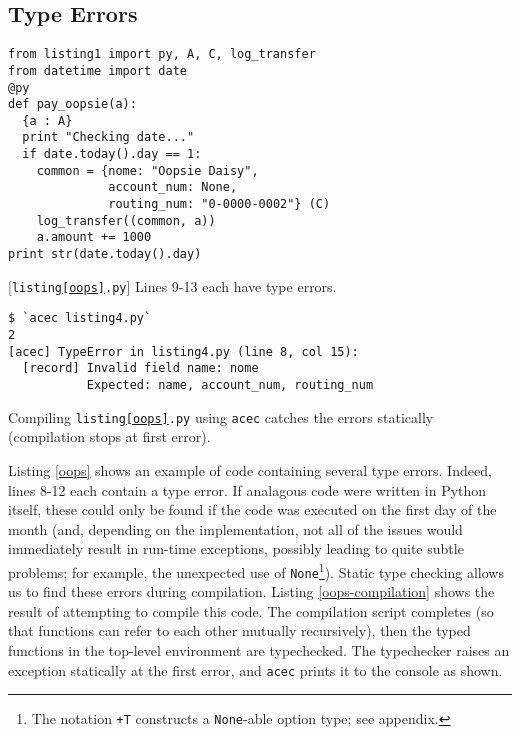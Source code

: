 \documentclass[10pt,preprint]{sigplanconf}
\begin{document}
{%

\subsection{Type Errors}
\begin{codelisting}[t]
\begin{lstlisting}
from listing1 import py, A, C, log_transfer
from datetime import date
@py
def pay_oopsie(a):
  {a : A}
  print "Checking date..."
  if date.today().day == 1:
    common = {nome: "Oopsie Daisy",
              account_num: None,
              routing_num: "0-0000-0002"} (C)
    log_transfer((common, a))
    a.amount += 1000 
print str(date.today().day)
\end{lstlisting}
\caption{[\texttt{listing\ref{oops}.py}] Lines 9-13 each have type errors.}
\label{oops}
\end{codelisting}
\begin{codelisting}
\begin{lstlisting}[style=Bash]
$ `acec listing4.py`
2
[acec] TypeError in listing4.py (line 8, col 15): 
  [record] Invalid field name: nome
           Expected: name, account_num, routing_num
\end{lstlisting}
\caption{Compiling \texttt{listing\ref{oops}.py} using \texttt{acec} catches the errors statically (compilation stops at first error).}
\label{oops-compilation}
\end{codelisting}Listing \ref{oops} shows an example of code containing several type errors. Indeed, lines 8-12 each contain a type error. If analagous code were written in Python itself, these could only be found if the code was executed on the first day of the month (and, depending on the implementation, not all of the issues would  immediately result in run-time exceptions, possibly leading to quite subtle problems; for example, the unexpected use of \verb|None|\footnote{The notation \texttt{+T} constructs a \texttt{None}-able option type; see appendix.}). Static type checking allows us to find these errors during compilation. Listing \ref{oops-compilation} shows the result of attempting to compile this code. The compilation script completes (so that functions can refer to each other mutually recursively), then the typed functions in the top-level environment are typechecked. The typechecker raises an exception statically at the first error, and \verb|acec| prints it to the console as shown.




}
\end{document}
